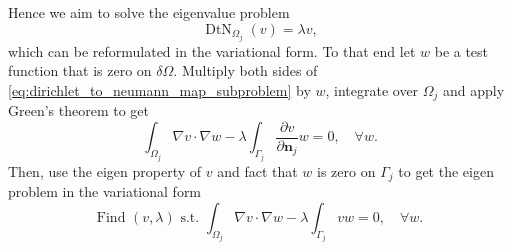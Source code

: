 Hence we aim to solve the eigenvalue problem
\[
    \operatorname{DtN}_{\Omega_j}\left(v\right) = \lambda v,
\]
which can be reformulated in the variational form. To that end let $w$ be a test function that is zero on $\delta \Omega$. Multiply both sides of \cref{eq:dirichlet_to_neumann_map_subproblem} by $w$, integrate over $\Omega_j$ and apply Green's theorem to get
\[
    \int_{\Omega_j} \nabla v \cdot \nabla w - \lambda \int_{\Gamma_j} \frac{\partial v}{\partial \mathbf{n}_j}w = 0, \quad \forall w.
\]
Then, use the eigen property of $v$ and fact that $w$ is zero on $\Gamma_j$ to get the eigen problem in the variational form
\begin{equation}
    \text{Find } (v, \lambda) \text{ s.t. } \int_{\Omega_j} \nabla v \cdot \nabla w - \lambda \int_{\Gamma_j} vw = 0, \quad \forall w.
    \label{eq:dirichlet_to_neumann_map_eigenproblem}
\end{equation}

